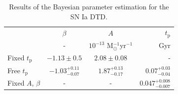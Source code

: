 \documentclass[fleqn,usenatbib]{mnras}
\begin{document}
\renewcommand{\arraystretch}{1.2}
\begin{table}
	\centering
	\caption{Results of the Bayesian parameter estimation for the SN Ia DTD.}
	\label{tab:dtd_results}
	\begin{tabular}{lccr} %
		\hline
		 &$\beta$ & $A$ & $t_{\mathrm{p}}$\\
		 &-       & $10^{-13}$ M$_{\odot}^{-1}$yr$^{-1}$ & Gyr \\
		\hline
		Fixed $t_{\mathrm{p}}$ & $-1.13\pm0.5$ &  $2.08 \pm 0.08$ & -\\
		Free $t_{\mathrm{p}}$ & $-1.03 _{-0.07} ^{+0.11}$ & $1.87 _{-0.17} ^{+0.13}$ & $0.07 _{-0.04} ^{+0.03}$\\
		Fixed $A$, $\beta$ & - & - & $0.047_{-0.007}^{+0.008}$\\
		\hline
	\end{tabular}
\end{table}
\end{document}
